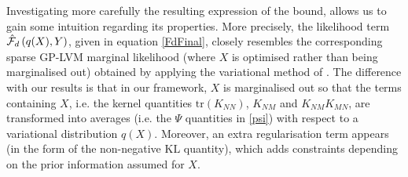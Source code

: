 

Investigating more carefully the resulting expression of the bound, 
allows us to gain some intuition regarding
its properties. More precisely, the likelihood term $\hat{\mathcal{F}}_d \left( q(X), Y \right)$,
given in equation \eqref{FdFinal}, 
closely resembles the corresponding sparse GP-LVM
marginal likelihood (where $X$ is optimised rather than being marginalised
out) obtained by applying the variational method of \cite{Titsias:variational09}.
The difference with our results is that in our framework,
$X$ is marginalised out so that the terms containing $X$, i.e. the kernel
quantities $\text{tr}(K_{NN})$, $K_{NM}$ and $K_{NM} K_{MN}$, are transformed
into averages (i.e. the $\Psi$ quantities in \eqref{psi}) with respect to a
variational distribution $q(X)$. Moreover, an extra regularisation term appears
(in the form of the non-negative $\text{KL}$ quantity), which adds constraints
depending on the prior information assumed for $X$.













